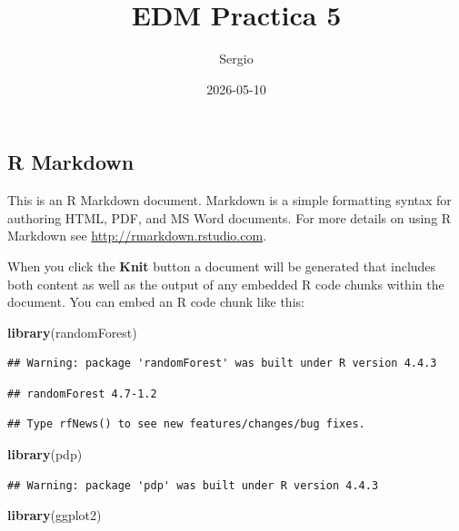 \documentclass[
]{article}
\title{EDM Practica 5}
\author{Sergio}
\date{2026-05-10}
\newenvironment{Shaded}{\begin{snugshade}}{\end{snugshade}}
\newcommand{\FunctionTok}[1]{\textcolor[rgb]{0.13,0.29,0.53}{\textbf{#1}}}
\newcommand{\NormalTok}[1]{#1}
\begin{document}
\maketitle

\subsection{R Markdown}\label{r-markdown}

This is an R Markdown document. Markdown is a simple formatting syntax
for authoring HTML, PDF, and MS Word documents. For more details on
using R Markdown see \url{http://rmarkdown.rstudio.com}.

When you click the \textbf{Knit} button a document will be generated
that includes both content as well as the output of any embedded R code
chunks within the document. You can embed an R code chunk like this:

\begin{Shaded}
\begin{Highlighting}[]
\FunctionTok{library}\NormalTok{(randomForest)}
\end{Highlighting}
\end{Shaded}

\begin{verbatim}
## Warning: package 'randomForest' was built under R version 4.4.3
\end{verbatim}

\begin{verbatim}
## randomForest 4.7-1.2
\end{verbatim}

\begin{verbatim}
## Type rfNews() to see new features/changes/bug fixes.
\end{verbatim}

\begin{Shaded}
\begin{Highlighting}[]
\FunctionTok{library}\NormalTok{(pdp)}
\end{Highlighting}
\end{Shaded}

\begin{verbatim}
## Warning: package 'pdp' was built under R version 4.4.3
\end{verbatim}

\begin{Shaded}
\begin{Highlighting}[]
\FunctionTok{library}\NormalTok{(ggplot2)}
\end{Highlighting}
\end{Shaded}
\end{document}
